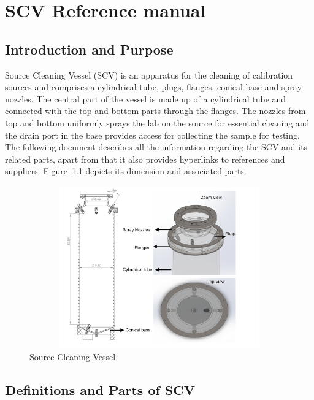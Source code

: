 \chapter{SCV Reference manual}
\section{Introduction and Purpose}
Source Cleaning Vessel (SCV) is an apparatus for the cleaning of calibration sources and comprises a cylindrical tube, plugs, flanges, conical base and spray nozzles. The central part of the vessel is made up of a  cylindrical tube and connected with the top and bottom parts through the flanges. The nozzles from top and bottom uniformly sprays the lab on the source for essential cleaning and the drain port in the base provides access for collecting the sample for testing. The following document describes all the information regarding the SCV and its related parts, apart from that it also provides hyperlinks to references and suppliers. Figure~\ref{fig:SCV} depicts its dimension and associated parts.
\begin{figure}[!htpb]
  \centering
  \includegraphics[width = 12cm, height=7cm ]{figures/SCV}
  \caption{Source Cleaning Vessel}
  \label{fig:SCV}
\end{figure}

\section{ Definitions and Parts of SCV}

